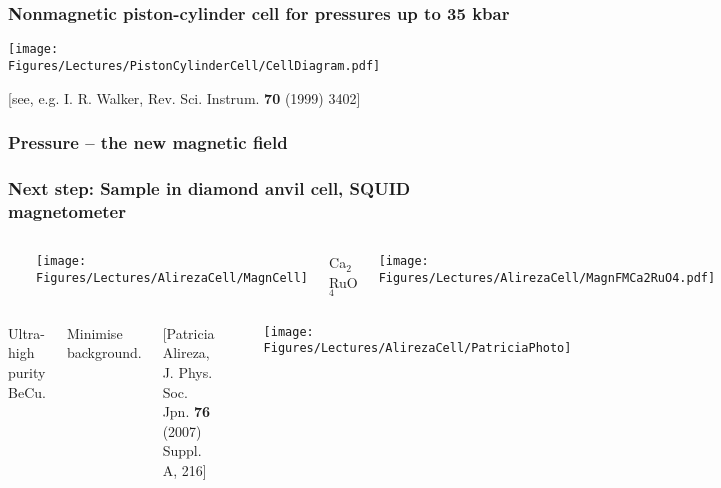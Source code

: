 \begin{frame}[label=Susceptibility]
\frametitle{Nonmagnetic piston-cylinder cell for pressures up to 35 kbar}

\texttt{[image: \\Figures/Lectures/PistonCylinderCell/CellDiagram.pdf]}

\centerline {\scriptsize [see, e.g. I. R. Walker, Rev. Sci. Instrum. {\bf 70} (1999) 3402]}
\end{frame}


\begin{frame}[label=Pressure ranges]
\frametitle{Pressure -- the new magnetic field}

\centerline{}


\end{frame}



\begin{frame}[label=AlirezaCell]
\frametitle{Next step: Sample in diamond anvil cell, SQUID magnetometer}

\begin{columns}[t]
\vspace{-3em}
\centerline{~}
\centerline{\texttt{[image: \\Figures/Lectures/AlirezaCell/MagnCell]}}


\centerline{\hspace{2em}Ca$_2$RuO$_4$} 
\vspace{-1em}


 {\centerline{\texttt{[image: \\Figures/Lectures/AlirezaCell/MagnFMCa2RuO4.pdf]}}}

\end{columns}

\begin{columns}
\bi
\item
Ultra-high purity BeCu.

\item
Minimise background.

\ei
\centerline{\scriptsize[Patricia Alireza, J. Phys. Soc. Jpn. {\bf 76} (2007) Suppl. A, 216]} 

\centerline{~}
\centerline{\texttt{[image: \\Figures/Lectures/AlirezaCell/PatriciaPhoto]}}

\end{columns}

\end{frame}

